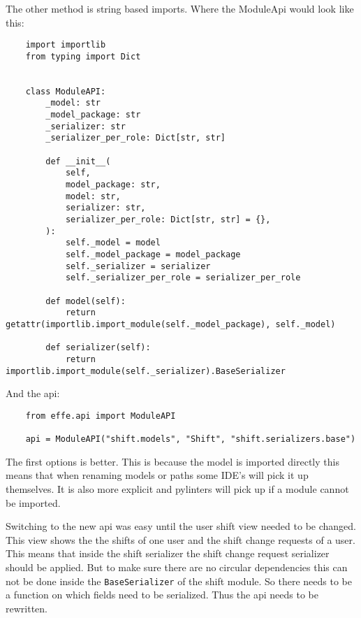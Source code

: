 The other method is string based imports. Where the ModuleApi would look like this:
\begin{verbatim}
    import importlib
    from typing import Dict


    class ModuleAPI:
        _model: str
        _model_package: str
        _serializer: str
        _serializer_per_role: Dict[str, str]

        def __init__(
            self,
            model_package: str,
            model: str,
            serializer: str,
            serializer_per_role: Dict[str, str] = {},
        ):
            self._model = model
            self._model_package = model_package
            self._serializer = serializer
            self._serializer_per_role = serializer_per_role

        def model(self):
            return getattr(importlib.import_module(self._model_package), self._model)

        def serializer(self):
            return importlib.import_module(self._serializer).BaseSerializer
\end{verbatim}

And the api:
\begin{verbatim}
    from effe.api import ModuleAPI

    api = ModuleAPI("shift.models", "Shift", "shift.serializers.base")
\end{verbatim}

The first options is better. This is because the model is imported directly this means that when renaming models or paths some IDE's will pick it up themselves. It is also more explicit and pylinters will pick up if a module cannot be imported.

Switching to the new api was easy until the user shift view needed to be changed. This view shows the the shifts of one user and the shift change requests of a user. This means that inside the shift serializer the shift change request serializer should be applied. But to make sure there are no circular dependencies this can not be done inside the \texttt{BaseSerializer} of the shift module. So there needs to be a function on which fields need to be serialized. Thus the api needs to be rewritten.

